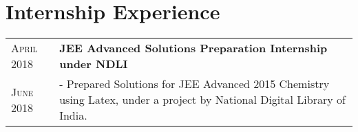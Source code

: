 \documentclass[a4paper,10pt]{extarticle} %
\begin{document}
  \section{\textcolor{primary}{Internship Experience}}
  \begin{tabularx}{\linewidth}{ l | X }
  \textsc{April 2018} & \textbf{JEE Advanced Solutions Preparation Internship under NDLI}\\
  \textsc{June 2018} & {- Prepared Solutions for JEE Advanced 2015 Chemistry using Latex, under a project by National Digital Library of India.}\\
  \end{tabularx}
  
\end{document}

